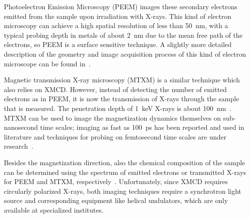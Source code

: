 \documentclass[11pt,a4paper,english,twoside]{article}
\begin{document}
Photoelectron Emission Microscopy (PEEM) images these secondary electrons emitted from the sample upon irradiation with X-rays. This kind of electron microscopy can achieve a high spatial resolution of less than \SI{50}{\nano\metre}, with a typical probing depth in metals of about \SI{2}{\nano\metre} due to the mean free path of the electrons, so PEEM is a surface sensitive technique. A slightly more detailed description of the geometry and image acquisition process of this kind of electron microscope can be found in~\cite{PEEM}. \par 

Magnetic transmission X-ray microscopy (MTXM) is a similar technique which also relies on XMCD. However, instead of detecting the number of emitted electrons as in PEEM, it is now the transmission of X-rays through the sample that is measured. The penetration depth of \SI{1}{\kilo\electronvolt} X-rays is about \SI{100}{\nano\metre}~\cite{Imaging_MTXM}. MTXM can be used to image the magnetization dynamics themselves on sub-nanosecond time scales; imaging as fast as \SI{100}{\pico\second} has been reported and used in literature and techniques for probing on femtosecond time scales are under research~\cite{SubnanosecondPropagation_AnisotropyChains, Imaging_MTXM}. \par

Besides the magnetization direction, also the chemical composition of the sample can be determined using the spectrum of emitted electrons or transmitted X-rays for PEEM and MTXM, respectively~\cite{PEEM,Imaging_MTXM}. Unfortunately, since XMCD requires circularly polarized X-rays, both imaging techniques require a synchrotron light source and corresponding equipment like helical undulators, which are only available at specialized institutes.
\end{document}
